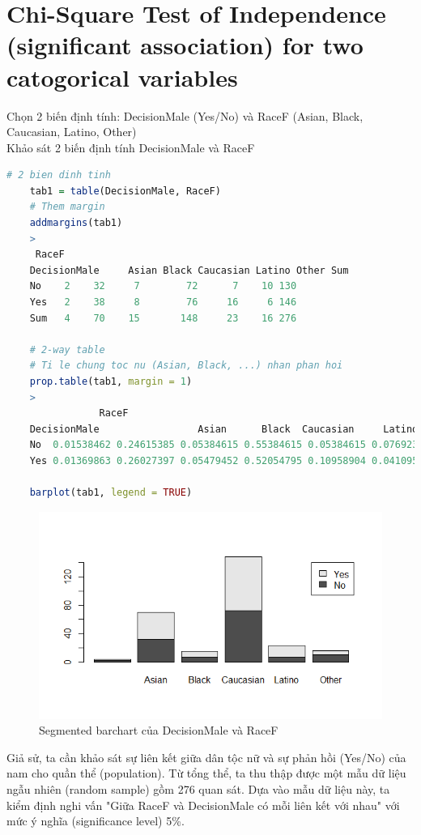 \documentclass[a4paper,12pt]{article}
\begin{document}
	\section{Chi-Square Test of Independence (significant association) for two catogorical variables}
	
	Chọn 2 biến định tính: DecisionMale (Yes/No) và RaceF (Asian, Black, Caucasian, Latino, Other)\\
	
	Khảo sát 2 biến định tính DecisionMale và RaceF
	
	\begin{lstlisting}[language=R]
	# 2 bien dinh tinh
	tab1 = table(DecisionMale, RaceF)
	# Them margin
	addmargins(tab1)
	>
	 RaceF
	DecisionMale     Asian Black Caucasian Latino Other Sum
	No    2    32     7        72      7    10 130
	Yes   2    38     8        76     16     6 146
	Sum   4    70    15       148     23    16 276
	
	# 2-way table
	# Ti le chung toc nu (Asian, Black, ...) nhan phan hoi
	prop.table(tab1, margin = 1)
	>
	            RaceF
	DecisionMale                 Asian      Black  Caucasian     Latino      Other
	No  0.01538462 0.24615385 0.05384615 0.55384615 0.05384615 0.07692308
	Yes 0.01369863 0.26027397 0.05479452 0.52054795 0.10958904 0.04109589
	
	barplot(tab1, legend = TRUE)
	\end{lstlisting}
	\begin{figure}[H]
		\centering
		\includegraphics[width=0.7\linewidth]{segmented_barchart}
		\caption{Segmented barchart của DecisionMale và RaceF}
		\label{fig:barchart}
	\end{figure}
	
	Giả sử, ta cần khảo sát sự liên kết giữa dân tộc nữ và sự phản hồi (Yes/No) của nam cho quần thể (population). Từ tổng thể, ta thu thập được một mẫu dữ liệu ngẫu nhiên (random sample) gồm 276 quan sát. Dựa vào mẫu dữ liệu này, ta kiểm định nghi vấn "Giữa RaceF và DecisionMale có mỗi liên kết với nhau" với mức ý nghĩa (significance level) 5\%.\\
	
\end{document}
